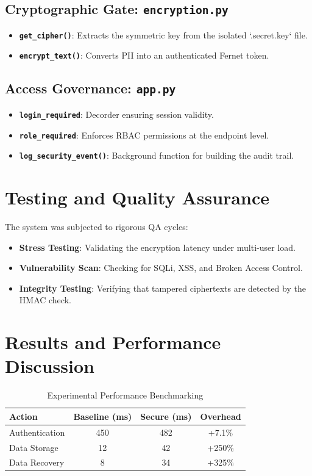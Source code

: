 \documentclass[conference,onecolumn]{IEEEtran}
\begin{document}
\subsection{Cryptographic Gate: \texttt{encryption.py}}
\begin{itemize}
    \item \textbf{\texttt{get\_cipher()}}: Extracts the symmetric key from the isolated `.secret.key` file.
    \item \textbf{\texttt{encrypt\_text()}}: Converts PII into an authenticated Fernet token.
\end{itemize}

\subsection{Access Governance: \texttt{app.py}}
\begin{itemize}
    \item \textbf{\texttt{login\_required}}: Decorder ensuring session validity.
    \item \textbf{\texttt{role\_required}}: Enforces RBAC permissions at the endpoint level.
    \item \textbf{\texttt{log\_security\_event()}}: Background function for building the audit trail.
\end{itemize}

\section{Testing and Quality Assurance}
The system was subjected to rigorous QA cycles:
\begin{itemize}
    \item \textbf{Stress Testing}: Validating the encryption latency under multi-user load.
    \item \textbf{Vulnerability Scan}: Checking for SQLi, XSS, and Broken Access Control.
    \item \textbf{Integrity Testing}: Verifying that tampered ciphertexts are detected by the HMAC check.
\end{itemize}

\section{Results and Performance Discussion}
\begin{table}[h]
\centering
\caption{Experimental Performance Benchmarking}
\begin{tabular}{l c c c}
\toprule
\textbf{Action} & \textbf{Baseline (ms)} & \textbf{Secure (ms)} & \textbf{Overhead} \\
\midrule
Authentication & 450 & 482 & +7.1\% \\
Data Storage & 12 & 42 & +250\% \\
Data Recovery & 8 & 34 & +325\% \\
\bottomrule
\end{tabular}
\end{table}
\end{document}
